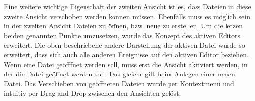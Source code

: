 Eine weitere wichtige Eigenschaft der zweiten Ansicht ist es, dass Dateien in
diese zweite Ansicht verschoben werden können müssen. Ebenfalls muss es möglich
sein in der zweiten Ansicht Dateien zu öffnen, bzw. neue zu erstellen. Um die
letzen beiden genannten Punkte umzusetzen, wurde das Konzept des aktiven
Editors erweitert. Die oben beschriebene andere Darstellung der aktiven Datei
wurde so erweitert, dass sich auch alle anderen Ereignisse auf den aktiven
Editor beziehen. Wenn eine Datei geöfffnet werden soll, muss erst die Ansicht
aktiviert werden, in der die Datei geöffnet werden soll. Das gleiche gilt beim
Anlegen einer neuen Datei. Das Verschieben von geöffneten Dateien wurde per
Kontextmenü und intuitiv per Drag and Drop zwischen den Ansichten gelöst.
